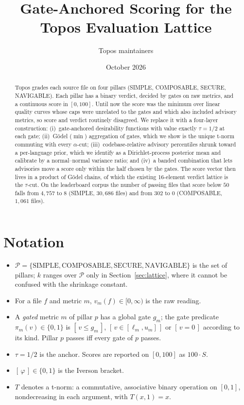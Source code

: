 \documentclass[11pt]{article}
\title{Gate-Anchored Scoring for the Topos Evaluation Lattice}
\author{Topos maintainers}
\date{October 2026}
\theoremstyle{remark}
\newcommand{\ind}[1]{[\,#1\,]}
\begin{document}
\maketitle

\begin{abstract}
Topos grades each source file on four pillars (SIMPLE, COMPOSABLE, SECURE,
NAVIGABLE). Each pillar has a binary verdict, decided by gates on raw metrics,
and a continuous score in $[0,100]$. Until now the score was the minimum over
linear quality curves whose caps were unrelated to the gates and which also
included advisory metrics, so score and verdict routinely disagreed. We replace
it with a four-layer construction: (i)~gate-anchored desirability functions
with value exactly $\tau = 1/2$ at each gate; (ii)~Gödel ($\min$) aggregation of
gates, which we show is the unique t-norm commuting with every $\alpha$-cut;
(iii)~codebase-relative advisory percentiles shrunk toward a per-language prior,
which we identify as a Dirichlet-process posterior mean and calibrate by a
normal--normal variance ratio; and (iv)~a banded combination that lets
advisories move a score only within the half chosen by the gates. The score
vector then lives in a product of Gödel chains, of which the existing
16-element verdict lattice is the $\tau$-cut. On the leaderboard corpus the
number of passing files that score below $50$ falls from $4{,}757$ to $8$
(SIMPLE, $30{,}686$ files) and from $302$ to $0$ (COMPOSABLE, $1{,}061$ files).
\end{abstract}

\tableofcontents

\section{Notation}

\begin{itemize}
  \item $\mathcal P = \{\mathrm{SIMPLE}, \mathrm{COMPOSABLE}, \mathrm{SECURE},
        \mathrm{NAVIGABLE}\}$ is the set of pillars; $k$ ranges over $\mathcal P$
        only in Section~\ref{sec:lattice}, where it cannot be confused with the
        shrinkage constant.
  \item For a file $f$ and metric $m$, $v_m(f) \in [0,\infty)$ is the raw
        reading.
  \item A \emph{gated} metric $m$ of pillar $p$ has a global gate $g_m$; the
        gate predicate $\pi_m(v) \in \{0,1\}$ is $\ind{v \le g_m}$,
        $\ind{v \in [\ell_m, u_m]}$ or $\ind{v = 0}$ according to its kind.
        Pillar $p$ passes iff every gate of $p$ passes.
  \item $\tau = 1/2$ is the anchor. Scores are reported on $[0,100]$ as
        $100 \cdot S$.
  \item $\ind{\varphi} \in \{0,1\}$ is the Iverson bracket.
  \item $T$ denotes a t-norm: a commutative, associative binary operation on
        $[0,1]$, nondecreasing in each argument, with $T(x,1) = x$.
\end{itemize}
\end{document}
